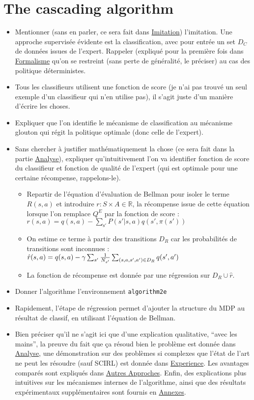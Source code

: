 \documentclass[11pt]{article}
\begin{document}
\section{The cascading algorithm}
\label{sec-4}
\begin{itemize}
\item Mentionner (sans en parler, ce sera fait dans \hyperref[sec-7-1]{Imitation}) l'imitation. Une approche supervisée évidente est la classification, avec pour entrée un set $D_C$ de données issues de l'expert. Rappeler (expliqué pour la première fois dans \hyperref[sec-3]{Formalisme} qu'on se restreint (sans perte de généralité, le préciser) au cas des politique déterministes.
\item Tous les classifieurs utilisent une fonction de score (je n'ai pas trouvé un seul exemple d'un classifieur qui n'en utilise pas), il s'agit juste d'un manière d'écrire les choses.
\item Expliquer que l'on identifie le mécanisme de classification au mécanisme glouton qui régit la politique optimale (donc celle de l'expert).
\item Sans chercher à justifier mathématiquement la chose (ce sera fait dans la partie \hyperref[sec-5]{Analyse}), expliquer qu'intuitivement l'on va identifier fonction de score du classifieur et fonction de qualité de l'expert (qui est optimale pour une certaine récompense, rappelons-le).
\begin{itemize}
\item Repartir de l'équation d'évaluation de Bellman pour isoler le terme $R(s,a)$ et introduire $r:S\times A\in \mathbb{R}$, la récompense issue de cette équation lorsque l'on remplace $Q^E$ par la fonction de score : $r(s,a) =q(s,a) - \sum_{\mathrm{s'}}P(s'|s,a)q(s',\pi(s')) $
\item On estime ce terme à partir des transitions $D_R$ car les probabilités de transitions sont inconnues : $\hat r(s,a) = q(s,a)-\gamma \sum_{s'} {1\over N_{s'}}\sum_{(s,a,s',a')\in D_R}q(s',a')$
\item La fonction de récompense est donnée par une régression sur $D_R \cup {\hat r}$.
\end{itemize}
\item Donner l'algorithme l'environnement \texttt{algorithm2e}
\item Rapidement, l'étape de régression permet d'ajouter la structure du MDP au résultat de classif, en utilisant l'équation de Bellman.
\item Bien préciser qu'il ne s'agit ici que d'une explication qualitative, ``avec les mains'', la preuve du fait que ça résoud bien le problème est donnée dans \hyperref[sec-5]{Analyse}, une démonstration sur des problèmes si complexes que l'état de l'art ne peut les résoudre (sauf SCIRL) est donnée dans \hyperref[Experience]{Experience}. Les avantages comparés sont expliqués dans \hyperref[Autres-Approches]{Autres Approches}. Enfin, des explications plus intuitives sur les mécanismes internes de l'algorithme, ainsi que des résultats expérimentaux supplémentaires sont fournis en \hyperref[sec-9]{Annexes}.
\end{itemize}
\end{document}
